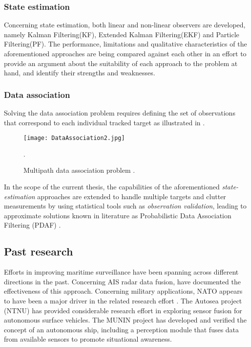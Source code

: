 \subsubsection{State estimation}
Concerning state estimation, both linear and non-linear observers are developed, namely Kalman Filtering(KF), Extended Kalman Filtering(EKF) and Particle Filtering(PF). The performance, limitations and qualitative characteristics of the aforementioned approaches are being compared against each other in an effort to provide an argument about the suitability of each approach to the problem at hand, and identify their strengths and weaknesses.
\subsubsection{Data association}
Solving the data association problem requires defining the set of observations that correspond to each individual tracked target as illustrated in  .


\begin{figure}[H]
	\centering
	\texttt{[image: DataAssociation2.jpg]}
	\caption{ Multipath data association problem \cite{Lan2019}.}.
	\label{fig:MultipathDA}
\end{figure}

In the scope of the current thesis, the capabilities of the aforementioned \emph{state-estimation} approaches are extended to handle multiple targets and clutter measurements by using statistical tools such as \emph{observation validation}, leading to approximate solutions known in literature as Probabilistic Data Association Filtering (PDAF) \cite{BarShalom1980}. 

\subsection{Past research}
Efforts in improving maritime surveillance have been spanning across different directions in the past. Concerning  AIS radar data fusion,  \cite{Habtemariam2015}  \cite{Heymann2015} have documented the effectiveness of this approach. Concerning military applications, NATO appears to have been a major driver in the related research effort \cite{Guerriero2008,9781586035365}. The Autosea project (NTNU)  \cite{Brekke2019}has provided considerable research effort in exploring sensor fusion for autonomous surface vehicles. The MUNIN project \cite{MUNIN} has developed and verified the concept of an autonomous ship, including a perception module that fuses data from available sensors to promote situational awareness.
